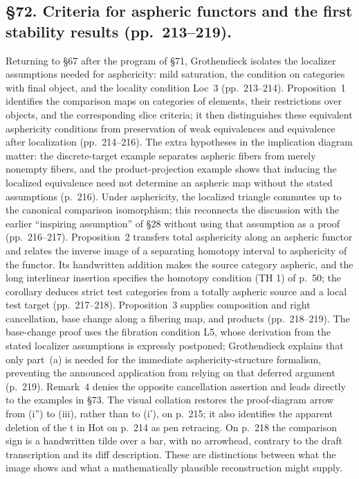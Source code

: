 \documentclass[10pt,oneside]{book}
\begin{document}
\subsection*{\S72. Criteria for aspheric functors and the first stability results (pp.\ 213--219).}
Returning to \S67 after the program of \S71, Grothendieck isolates the localizer assumptions needed for asphericity: mild saturation, the condition on categories with final object, and the locality condition Loc~3 (pp.\ 213--214). Proposition~1 identifies the comparison maps on categories of elements, their restrictions over objects, and the corresponding slice criteria; it then distinguishes these equivalent asphericity conditions from preservation of weak equivalences and equivalence after localization (pp.\ 214--216). The extra hypotheses in the implication diagram matter: the discrete-target example separates aspheric fibers from merely nonempty fibers, and the product-projection example shows that inducing the localized equivalence need not determine an aspheric map without the stated assumptions (p.\ 216). Under asphericity, the localized triangle commutes up to the canonical comparison isomorphism; this reconnects the discussion with the earlier ``inspiring assumption'' of \S28 without using that assumption as a proof (pp.\ 216--217). Proposition~2 transfers total asphericity along an aspheric functor and relates the inverse image of a separating homotopy interval to asphericity of the functor. Its handwritten addition makes the source category aspheric, and the long interlinear insertion specifies the homotopy condition (TH 1) of p.\ 50; the corollary deduces strict test categories from a totally aspheric source and a local test target (pp.\ 217--218). Proposition~3 supplies composition and right cancellation, base change along a fibering map, and products (pp.\ 218--219). The base-change proof uses the fibration condition L5, whose derivation from the stated localizer assumptions is expressly postponed; Grothendieck explains that only part~(a) is needed for the immediate asphericity-structure formalism, preventing the announced application from relying on that deferred argument (p.\ 219). Remark~4 denies the opposite cancellation assertion and leads directly to the examples in \S73. The visual collation restores the proof-diagram arrow from (i'') to (iii), rather than to (i'), on p.\ 215; it also identifies the apparent deletion of the t in Hot on p.\ 214 as pen retracing. On p.\ 218 the comparison sign is a handwritten tilde over a bar, with no arrowhead, contrary to the draft transcription and its diff description. These are distinctions between what the image shows and what a mathematically plausible reconstruction might supply.
\end{document}
